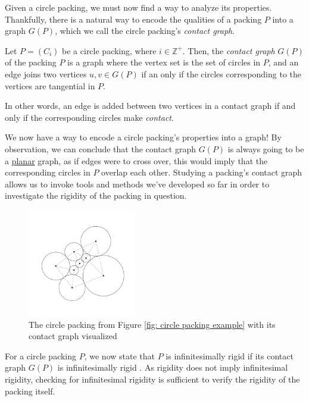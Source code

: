 \begin{flushleft}
Given a circle packing, we must now find a way to analyze its properties. Thankfully, there is a natural way to encode the qualities of a packing $P$ into a graph $G(P)$, which we call the circle packing's \textit{contact graph}.
\end{flushleft}

\begin{definition}
\label{def: contact graph}
Let $P = (C_i)$ be a circle packing, where $i \in \mathbb{Z}^+$. Then, the \textit{contact graph} $G(P)$ of the packing $P$ is a graph where the vertex set is the set of circles in $P$, and an edge joins two vertices $u, v \in G(P)$ if an only if the circles corresponding to the vertices are tangential in $P$.
\end{definition}

\begin{flushleft}
In other words, an edge is added between two vertices in a contact graph if and only if the corresponding circles make \textit{contact}.
\end{flushleft}

\begin{flushleft}
We now have a way to encode a circle packing's properties into a graph! By observation, we can conclude that the contact graph $G(P)$ is always going to be a \hyperref[def: planar graphs]{planar} graph, as if edges were to cross over, this would imply that the corresponding circles in $P$ overlap each other. Studying a packing's contact graph allows us to invoke tools and methods we've developed so far in order to investigate the rigidity of the packing in question. 
\end{flushleft}

\begin{figure}[htbp]
    \centering
    \includegraphics[width = 0.42\textwidth]{Chapter 3/8. Packing with contact.png}
    \caption{The circle packing from Figure \ref{fig: circle packing example} with its contact graph visualized}
    \label{fig: circle packing with contact}
\end{figure}
\vspace{-4 mm}
\begin{flushleft}
For a circle packing $P$, we now state that $P$ is infinitesimally rigid if its contact graph $G(P)$ is infinitesimally rigid \cite{sticky}. As rigidity does not imply infinitesimal rigidity, checking for infinitesimal rigidity is sufficient to verify the rigidity of the packing itself. 
\end{flushleft}

